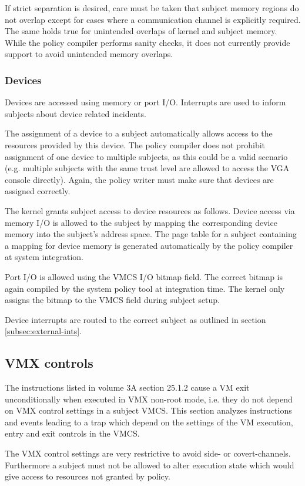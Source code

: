 If strict separation is desired, care must be taken that subject memory regions
do not overlap except for cases where a communication channel is explicitly
required. The same holds true for unintended overlaps of kernel and subject
memory.  While the policy compiler performs sanity checks, it does not currently
provide support to avoid unintended memory overlaps.

\subsubsection{Devices}
Devices are accessed using memory or port I/O. Interrupts are used to inform
subjects about device related incidents.

The assignment of a device to a subject automatically allows access to the
resources provided by this device. The policy compiler does not prohibit
assignment of one device to multiple subjects, as this could be a valid scenario
(e.g.  multiple subjects with the same trust level are allowed to access the VGA
console directly). Again, the policy writer must make sure that devices are
assigned correctly.

The kernel grants subject access to device resources as follows. Device access
via memory I/O is allowed to the subject by mapping the corresponding device
memory into the subject's address space. The page table for a subject containing
a mapping for device memory is generated automatically by the policy compiler at
system integration.

Port I/O is allowed using the VMCS I/O bitmap field. The correct bitmap is again
compiled by the system policy tool at integration time. The kernel only assigns
the bitmap to the VMCS field during subject setup.

Device interrupts are routed to the correct subject as outlined in section
\ref{subsec:external-ints}.

\subsection{VMX controls}\label{subsec:vmx-controls}
The instructions listed in \cite{IntelSDM} volume 3A section 25.1.2 cause a VM
exit unconditionally when executed in VMX non-root mode, i.e. they do not depend
on VMX control settings in a subject VMCS. This section analyzes instructions
and events leading to a trap which depend on the settings of the VM execution,
entry and exit controls in the VMCS.

The VMX control settings are very restrictive to avoid side- or covert-channels.
Furthermore a subject must not be allowed to alter execution state which would
give access to resources not granted by policy.

